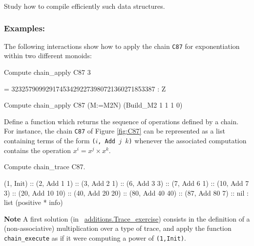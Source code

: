 \begin{project}
Study how  to compile efficiently such data structures.

\end{project}


\subsubsection*{Examples:} 
The following interactions show how to apply the chain \texttt{C87} 
for exponentiation within two different monoids:

\begin{Coqsrc}
Compute  chain_apply C87 3%
\end{Coqsrc}

\begin{Coqanswer}
 =  323257909929174534292273980721360271853387%
     : Z
\end{Coqanswer}

\begin{Coqsrc}
Compute chain_apply C87 (M:=M2N) (Build_M2 1 1 1 0)%
\end{Coqsrc}


\begin{project}
Define a function which returns the sequence of operations defined by a chain.
For instance, the chain \texttt{C87} of Figure \ref{fig:C87} can be represented as a 
list containing terms of the form \texttt{($i$, Add $j$ $k$)} whenever the associated computation contains the operation $x^i=x^j\times x^k$.


\begin{Coqsrc}
Compute chain_trace C87.
\end{Coqsrc}

\begin{Coqanswer}
(1, Init)
       :: (2, Add 1 1)
          :: (3, Add 2 1)
             :: (6, Add 3 3)
                :: (7, Add 6 1)
                   :: (10, Add 7 3)
                      :: (20, Add 10 10)
                         :: (40, Add 20 20)
                            :: (80, Add 40 40) :: (87, Add 80 7) :: nil
     : list (positive * info)
\end{Coqanswer}
  

\textbf{Note} A first solution (in ~\href{../theories/html/hydras.additions.Trace_exercise.html}{additions.Trace\_exercise}) consists in the definition of 
a (non-associative) multiplication over a type of trace, and apply the function
\texttt{chain\_execute} as if it were computing a power of \texttt{(1,Init)}.


\end{project}

